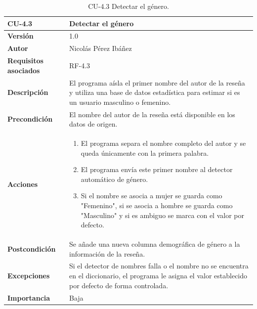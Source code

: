 \begin{table}[p]
	\centering
	\begin{tabularx}{\linewidth}{ p{} p{} }
		\toprule
		\textbf{CU-4.3}  & \textbf{Detectar el género}\\
		\toprule
		\textbf{Versión}              & 1.0    \\
		\textbf{Autor}                & Nicolás Pérez Ibáñez \\
		\textbf{Requisitos asociados} & RF-4.3 \\
		\textbf{Descripción}          & El programa aísla el primer nombre del autor de la reseña y utiliza una base de datos estadística para estimar si es un usuario masculino o femenino. \\
		\textbf{Precondición}         & El nombre del autor de la reseña está disponible en los datos de origen. \\
		\textbf{Acciones}             &
		\begin{enumerate}
			\def\labelenumi{\arabic{enumi}.}
			\tightlist
			\item El programa separa el nombre completo del autor y se queda únicamente con la primera palabra.
			\item El programa envía este primer nombre al detector automático de género.
			\item Si el nombre se asocia a mujer se guarda como "Femenino", si se asocia a hombre se guarda como "Masculino" y si es ambiguo se marca con el valor por defecto.
		\end{enumerate}\\
		\textbf{Postcondición}        & Se añade una nueva columna demográfica de género a la información de la reseña. \\
		\textbf{Excepciones}          & Si el detector de nombres falla o el nombre no se encuentra en el diccionario, el programa le asigna el valor establecido por defecto de forma controlada. \\
		\textbf{Importancia}          & Baja \\
		\bottomrule
	\end{tabularx}
	\caption{CU-4.3 Detectar el género.}
\end{table}

